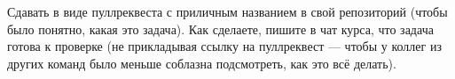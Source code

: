 \documentclass[a5paper]{homework}
\begin{document}
Сдавать в виде пуллреквеста с приличным названием в свой репозиторий (чтобы было понятно, какая это задача). Как сделаете, пишите в чат курса, что задача готова к проверке (не прикладывая ссылку на пуллреквест --- чтобы у коллег из других команд было меньше соблазна подсмотреть, как это всё делать).
\end{document}
